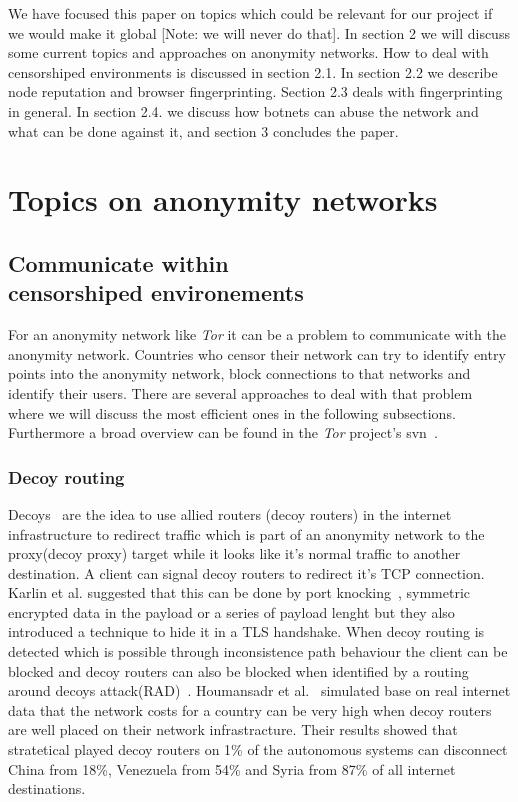 \documentclass{sig-alternate}
\begin{document}
We have focused this paper on topics which could be relevant for our project if we would make it global [Note: we will never do that]. In section 2 we will discuss some current topics and approaches on anonymity networks. How to deal with censorshiped environments is discussed in section 2.1. In section 2.2 we describe node reputation and browser fingerprinting. Section 2.3 deals with fingerprinting in general. In section 2.4. we discuss how botnets can abuse the network and what can be done against it, and section 3 concludes the paper.

\section{Topics on anonymity networks}

\subsection{Communicate within \\censorshiped environements}

For an anonymity network like \textit{Tor} it can be a problem to communicate with the anonymity network. Countries who censor their network can try to identify entry points into the anonymity network, block connections to that networks and identify their users. There are several approaches to deal with that problem where we will discuss the most efficient ones in the following subsections. Furthermore a broad overview can be found in the \textit{Tor} project's svn~\cite{linkTwelve}.
\subsubsection{Decoy routing}

Decoys~\cite{karlin2011decoy, houmansadr2011cirripede, wustrow2011telex}
are the idea to use allied routers (decoy routers) in the internet infrastructure to redirect traffic which is part of an anonymity network to the proxy(decoy proxy) target while it looks like it's normal traffic to another destination. A client can signal decoy routers to redirect it's TCP connection. Karlin et al. suggested that this can be done by port knocking~\cite{karlin2011decoy}, symmetric encrypted data in the payload or a series of payload lenght but they also introduced a technique to hide it in a TLS handshake. When decoy routing is detected which is possible through inconsistence path behaviour the client can be blocked and decoy routers can also be blocked when identified by a routing around decoys attack(RAD)~\cite{schuchard2012routing}. Houmansadr et al.~\cite{houmansadr2014no} simulated base on real internet data that the network costs for a country can be very high when decoy routers are well placed on their network infrastracture. Their results showed that stratetical played decoy routers on 1\% of the autonomous systems can disconnect China from 18\%, Venezuela from 54\% and Syria from 87\% of all internet destinations.
\end{document}
